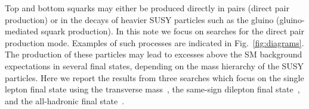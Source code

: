 
Top and bottom squarks may either be produced directly in pairs
(direct pair production) or in the decays of heavier SUSY particles such as the gluino (gluino-mediated squark production). 
In this note we focus on searches for the direct pair production mode.
Examples of such processes are indicated in Fig.~\ref{fig:diagrams}.
The production of these particles may lead to excesses above the SM background expectations in several final states, 
depending on the mass hierarchy of the SUSY particles.
Here we report the results from three searches which focus on the single lepton final state using the transverse
mass~\cite{ref:stop}, the same-sign dilepton final state~\cite{ref:ss}, and the all-hadronic final state~\cite{ref:alphat}.

